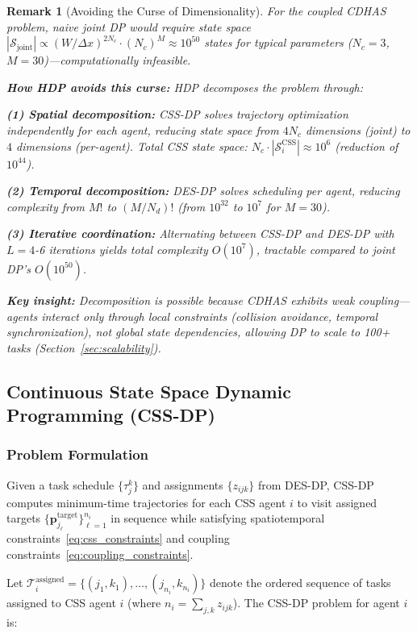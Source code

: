 \documentclass[manuscript,screen,review]{acmart}
\newtheorem{remark}{Remark}
\begin{document}
\begin{remark}[Avoiding the Curse of Dimensionality]
\label{rem:curse_dimensionality}
For the coupled CDHAS problem, naive joint DP would require state space 
$|\mathcal{S}_{\text{joint}}| \propto (W/\Delta x)^{2N_c} \cdot (N_c)^M 
\approx 10^{50}$ states for typical parameters ($N_c = 3$, $M = 30$)—computationally 
infeasible.

\textbf{How HDP avoids this curse:} HDP decomposes the problem through:

\textbf{(1) Spatial decomposition:} CSS-DP solves trajectory optimization 
independently for each agent, reducing state space from $4N_c$ dimensions 
(joint) to $4$ dimensions (per-agent). Total CSS state space: 
$N_c \cdot |\mathcal{S}_i^{\text{CSS}}| \approx 10^6$ (reduction of $10^{44}$).

\textbf{(2) Temporal decomposition:} DES-DP solves scheduling per agent, 
reducing complexity from $M!$ to $(M/N_d)!$ (from $10^{32}$ to $10^7$ for $M=30$).

\textbf{(3) Iterative coordination:} Alternating between CSS-DP and DES-DP 
with $L = 4$-6 iterations yields total complexity $O(10^7)$, tractable compared 
to joint DP's $O(10^{50})$.

\textbf{Key insight:} Decomposition is possible because CDHAS exhibits 
\textit{weak coupling}—agents interact only through local constraints (collision 
avoidance, temporal synchronization), not global state dependencies, allowing 
DP to scale to 100+ tasks (Section~\ref{sec:scalability}).
\end{remark}

\subsection{Continuous State Space Dynamic Programming (CSS-DP)}

\subsubsection{Problem Formulation}

Given a task schedule $\{\tau_j^k\}$ and assignments
$\{z_{ijk}\}$ from DES-DP, CSS-DP computes minimum-time
trajectories for each CSS agent $i$ to visit assigned targets
$\{\mathbf{p}_{j_\ell}^{\text{target}}\}_{\ell=1}^{n_i}$ in sequence while satisfying
spatiotemporal constraints~\eqref{eq:css_constraints} and coupling
constraints~\eqref{eq:coupling_constraints}.

Let $\mathcal{T}_i^{\text{assigned}} = \{(j_1, k_1), \ldots, (j_{n_i}, k_{n_i})\}$
denote the ordered sequence of tasks assigned to CSS agent $i$ (where
$n_i = \sum_{j,k} z_{ijk}$). The CSS-DP problem for agent $i$ is:
\end{document}
